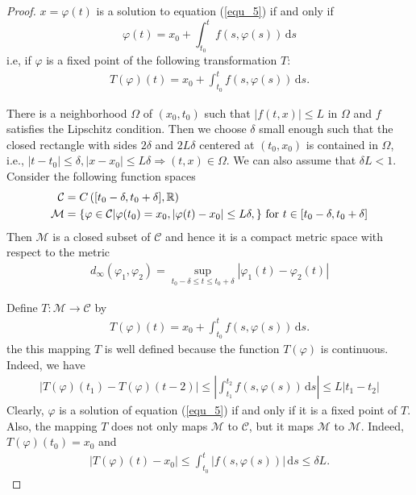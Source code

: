 \documentclass[12pt,leqno]{amsart}
\theoremstyle{definition}
\numberwithin{equation}{subsection}
\begin{document}
\begin{proof}
$x = \varphi(t)$ is a solution to equation (\ref{equ_5}) if and only if 
$$\varphi(t) = x_0 + \int^t_{t_0} f(s,\varphi(s))\, \text{d}s$$
i.e, if $\varphi$ is a fixed point of the following transformation $T$:
\begin{align*}
    T(\varphi)(t) = x_0 + \int^t_{t_0} f(s,\varphi(s))\, \text{d}s.
\end{align*}

There is a neighborhood $\Omega$ of $(x_0,t_0)$ such that $\left|f(t,x)\right|\leq L$ in $\Omega$ and $f$ satisfies the Lipschitz condition. Then we choose $\delta$ small enough such that the closed rectangle with sides $2\delta$ and $2L\delta$ centered at $(t_0,x_0)$ is contained in $\Omega$, i.e., $\left|t - t_0\right| \leq \delta, \left|x - x_0\right| \leq L\delta \Rightarrow (t,x)\in\Omega$. We can also assume that $\delta L < 1$. Consider the following function spaces 
\begin{align*}
    \mathcal{C}& = C\left([t_0 - \delta, t_0 + \delta], \mathbb{R}\right) \\
    \mathcal{M}& = \left\{\varphi\in\mathcal{C} | \varphi(t_0) = x_0, \left|\varphi(t) - x_0\right| \leq L\delta, \right\} \, {\rm for}\,\, t \in [t_0 - \delta, t_0 + \delta]
\end{align*}
Then $\mathcal{M}$ is a closed subset of $\mathcal{C}$ and hence it is a compact metric space with respect to the metric 
\begin{align*}
    d_\infty(\varphi_1, \varphi_2) = \sup_{t_0 - \delta \leq t \leq t_0 + \delta} \left|\varphi_1(t) - \varphi_2(t)\right|
\end{align*}

Define $T:\mathcal{M}\to\mathcal{C}$ by
\begin{align*}
    T(\varphi)(t) = x_0 + \int^t_{t_0} f(s,\varphi(s))\, \text{d}s.
\end{align*}
the this mapping $T$ is well defined because the function $T(\varphi)$ is continuous. Indeed, we have 
\begin{align*}
    \left|T(\varphi)(t_1) - T(\varphi)(t-2)\right| \leq \left|\int^{t_2}_{t_1} f(s,\varphi(s))\, \text{d}s \right| \leq L |t_1 - t_2|
\end{align*}
Clearly, $\varphi$ is a solution of equation (\ref{equ_5}) if and only if it is a fixed point of $T$. Also, the mapping $T$ does not only maps $\mathcal{M}$ to $\mathcal{C}$, but it maps $\mathcal{M}$ to $\mathcal{M}$. Indeed, $T(\varphi)(t_0) = x_0$ and  
\begin{align*}
    \left|T(\varphi)(t) - x_0\right| \leq \int^{t}_{t_0} \left|f(s,\varphi(s))\right|\, \text{d}s \leq \delta L.
\end{align*}


\end{proof}
\end{document}
